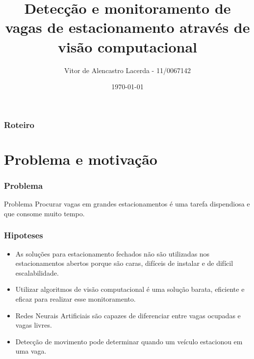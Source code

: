 \documentclass{beamer}
\title[Seminario TG1]{Detecção e monitoramento de vagas de estacionamento através de visão computacional}
\author{Vitor de Alencastro Lacerda - 11/0067142}
\institute[UnB]{
    Universidade de Brasília
    \medskip
}
\date{\today}
\begin{document}
\begin{frame}
\titlepage
\end{frame}

\begin{frame}
\frametitle{Roteiro} %
\tableofcontents %
\end{frame}




\section{Problema e motivação}

\begin{frame}
\frametitle{Problema}

\begin{block}{Problema}
    Procurar vagas em grandes estacionamentos é uma tarefa dispendiosa e que consome muito tempo.
\end{block}
\end{frame}

\begin{frame}
 \frametitle{Hipoteses}
 \begin{itemize}
   \item  As soluções para estacionamento fechados não são utilizadas nos estacionamentos abertos porque são caras, difíceis de instalar e de difícil escalabilidade.
   \item  Utilizar algoritmos de visão computacional é uma solução barata, eficiente e eficaz para realizar esse monitoramento.
   \item  Redes Neurais Artificiais são capazes de diferenciar entre vagas ocupadas e vagas livres.
   \item  Detecção de movimento pode determinar quando um veículo estacionou em uma vaga.
 \end{itemize}
\end{frame}
\end{document}

